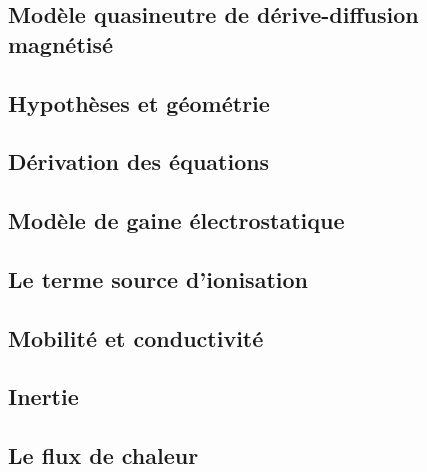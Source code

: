 \subsection{Modèle quasineutre de dérive-diffusion magnétisé}

\subsection{Hypothèses et géométrie}
\subsection{Dérivation des équations}
\subsection{Modèle de gaine électrostatique}
\subsection{Le terme source d'ionisation}
\subsection{Mobilité et conductivité}
\subsection{Inertie}
\subsection{Le flux de chaleur}




